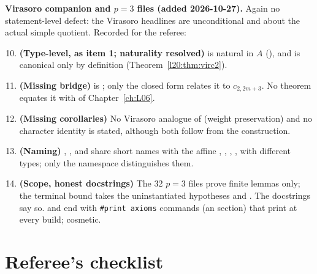 \textbf{Virasoro companion and $p=3$ files (added 2026-10-27).} Again no statement-level defect: the Virasoro headlines are
unconditional and about the actual simple quotient. Recorded for the referee:
\begin{enumerate}\setcounter{enumi}{9}
\item \textbf{(Type-level, as item 1; naturality resolved)}  is natural in $A$
  (), and
   is canonical only by definition (Theorem~\ref{l20:thm:virc2}).
\item \textbf{(Missing bridge)}  is ; only the closed form
   relates it to $c_{2,2m+3}$. No theorem equates it with  of Chapter~\ref{ch:L06}.
\item \textbf{(Missing corollaries)} No Virasoro analogue of  (weight preservation) and no character
  identity is stated, although both follow from the construction.
\item \textbf{(Naming)} , ,  and
   share short names with the affine , , ,
  , with different types; only the namespace distinguishes them.
\item \textbf{(Scope, honest docstrings)} The 32 $p=3$ files prove finite lemmas only; the terminal bound
   takes the uninstantiated hypotheses  and
  . The docstrings say so.  and
   end with \texttt{\#print axioms} commands (an  section) that print at
  every build; cosmetic.
\end{enumerate}

\section{Referee's checklist}\label{l20:sec:checklist}

